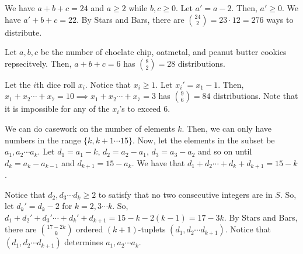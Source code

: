 \documentclass[11pt]{article}
\begin{document}

\sol We have $a+b+c=24$ and $a\ge 2$ while $b,c\ge 0$. Let $a'=a-2$. Then, $a'\ge 0$. We have $a'+b+c=22$. By Stars and Bars, there are $\binom{24}{2}=23\cdot 12=\boxed{276}$ ways to distribute.


\sol  Let $a,b,c$ be the number of choclate chip, oatmetal, and peanut butter cookies repsecitvely. Then, $a+b+c=6$ has $\binom{8}{2}=\boxed{28}$ distributions.


\sol Let the $i$th dice roll $x_{i}$. Notice that $x_{i}\ge 1$. Let $x_{i}'=x_{1}-1$. Then, $x_{1}+x_{2}\cdots + x_{7}=10\implies x_{1}+x_{2}\cdots + x_{7}=3$ has $\binom{9}{6}=\boxed{84}$ distributions. Note that it is impossible for any of the $x_{i}$'s to exceed $6$.


\sol We can do casework on the number of elements $k$. Then, we can only have numbers in the range $\{k,k+1\cdots 15\}$. Now, let the elements in the subset be $a_{1},a_{2}\cdots a_{k}$. Let $d_{1}=a_{1}-k$, $d_{2}=a_{2}-a_{1}$, $d_{3}=a_{3}-a_{2}$ and so on until $d_{k}=a_{k}-a_{k-1}$ and $d_{k+1}=15-a_{k}$. We have that $d_{1}+d_{2}\cdots + d_{k}+d_{k+1}=15-k$. 

Notice that $d_{2},d_{3}\cdots d_{k}\ge 2$ to satisfy that no two consecutive integers are in $S$. So, let $d_{k}'=d_{k}-2$ for $k=2,3\cdots k$. So, $d_{1}+d_{2}'+d_{3}'\cdots +d_{k}'+d_{k+1}=15-k-2(k-1)=17-3k$. By Stars and Bars, there are $\binom{17-2k}{k}$ ordered $(k+1)$-tuplets $(d_{1},d_{2}\cdots d_{k+1})$. Notice that $(d_{1},d_{2}\cdots d_{k+1})$ determines $a_{1},a_{2}\cdots a_{k}$.
\end{document}
